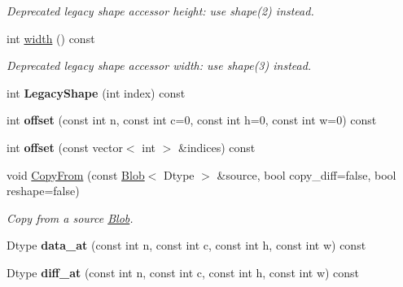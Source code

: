 \begin{DoxyCompactItemize}
\begin{DoxyCompactList}\small\item\em Deprecated legacy shape accessor height\+: use shape(2) instead. \end{DoxyCompactList}\item 
int \hyperlink{classcaffe_1_1Blob_a781b5410b7894455a85cd283cf8ee02a}{width} () const \hypertarget{classcaffe_1_1Blob_a781b5410b7894455a85cd283cf8ee02a}{}\label{classcaffe_1_1Blob_a781b5410b7894455a85cd283cf8ee02a}

\begin{DoxyCompactList}\small\item\em Deprecated legacy shape accessor width\+: use shape(3) instead. \end{DoxyCompactList}\item 
int {\bfseries Legacy\+Shape} (int index) const \hypertarget{classcaffe_1_1Blob_a6221f2df6da6167db15c2b18aac2e5ee}{}\label{classcaffe_1_1Blob_a6221f2df6da6167db15c2b18aac2e5ee}

\item 
int {\bfseries offset} (const int n, const int c=0, const int h=0, const int w=0) const \hypertarget{classcaffe_1_1Blob_a87022dfa6cc45b3a2727ccce9ccf4b2c}{}\label{classcaffe_1_1Blob_a87022dfa6cc45b3a2727ccce9ccf4b2c}

\item 
int {\bfseries offset} (const vector$<$ int $>$ \&indices) const \hypertarget{classcaffe_1_1Blob_a8463d5d004dc97580151c1a4283f00f6}{}\label{classcaffe_1_1Blob_a8463d5d004dc97580151c1a4283f00f6}

\item 
void \hyperlink{classcaffe_1_1Blob_a64ad51f99e88233f43a21a85ebe10284}{Copy\+From} (const \hyperlink{classcaffe_1_1Blob}{Blob}$<$ Dtype $>$ \&source, bool copy\+\_\+diff=false, bool reshape=false)
\begin{DoxyCompactList}\small\item\em Copy from a source \hyperlink{classcaffe_1_1Blob}{Blob}. \end{DoxyCompactList}\item 
Dtype {\bfseries data\+\_\+at} (const int n, const int c, const int h, const int w) const \hypertarget{classcaffe_1_1Blob_a3f12332d9d8a0a5adc12c8c75bbbd335}{}\label{classcaffe_1_1Blob_a3f12332d9d8a0a5adc12c8c75bbbd335}

\item 
Dtype {\bfseries diff\+\_\+at} (const int n, const int c, const int h, const int w) const \hypertarget{classcaffe_1_1Blob_a349ee9442e5ba9736b6ccf12359e776e}{}\label{classcaffe_1_1Blob_a349ee9442e5ba9736b6ccf12359e776e}


\end{DoxyCompactItemize}
